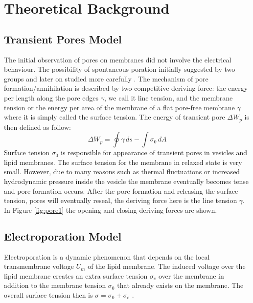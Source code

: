 \documentclass[english,12pt]{article}
\begin{document}
\section{Theoretical Background}
\subsection{Transient Pores Model}
The initial observation of pores on membranes did not involve the electrical behaviour. The possibility of spontaneous poration initially suggested by two groups and later on studied more carefully  \citep{Sandre, karatekin2003cascades}. The mechanism of pore formation/annihilation is described by two competitive deriving force: the energy per length along the pore edges $\gamma$, we call it line tension, and the membrane tension or the energy per area of the membrane of a flat pore-free membrane $\gamma$ where it is simply called the surface tension. The energy of transient pore $\Delta W_{p}$ is then defined as follow:
\begin{equation}
	\Delta W_{p} = \oint\gamma\,ds - \int\sigma_0\,dA
	\label{eqn:transientmodel}
\end{equation}
Surface tension $\sigma_0$ is responsible for appearance of transient pores in vesicles and lipid membranes. The surface tension for the membrane in relaxed state is very small. However, due to many reasons such as thermal fluctuations or increased hydrodynamic pressure inside the vesicle the membrane eventually becomes tense and pore formation occurs. After the pore formation and releasing the surface tension, pores will eventually reseal, the deriving force here is the line tension $\gamma$. In Figure \ref{fig:pore1} the opening and closing deriving forces are shown.


\subsection{Electroporation Model}
Electroporation is a dynamic phenomenon that depends on the local transmembrane voltage $U_{m}$ of the lipid membrane. The induced voltage over the lipid membrane creates an extra surface tension $\sigma_{e}$ over the membrane in addition to the membrane tension $\sigma_0$ that already exists on the membrane. The overall surface tension then is $\sigma=\sigma_0+\sigma_e$ .
\end{document}
